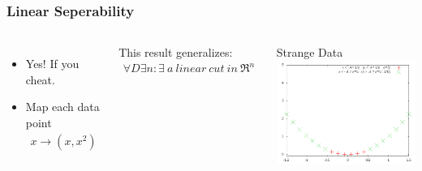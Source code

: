 \documentclass{beamer}
\begin{document}
\begin{frame}
\frametitle{Linear Seperability}
\begin{columns}[c]


\begin{itemize}
\item Yes! If you cheat.
\item Map each data point 
\begin{align}
x\longrightarrow (x,x^2)
\end{align}
\end{itemize}

\begin{theorem}
This result generalizes:
\begin{align}
\forall D \exists n : \exists\ a\ linear\ cut\ in\ \Re^n
\end{align}
\end{theorem}



\begin{block}{Strange Data}
\includegraphics[scale=.35]{../figures/example_1.png}
\end{block}

\end{columns}

\end{frame}

\end{document}
